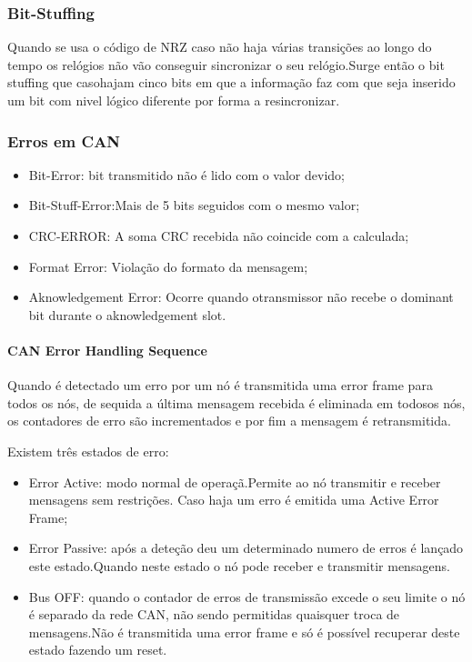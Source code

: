 \documentclass[10pt,a4paper]{paper}
\begin{document}
\subsubsection*{Bit-Stuffing}
Quando se usa o código de NRZ caso não haja várias transições ao longo do tempo os relógios não vão conseguir sincronizar o seu relógio.Surge então o bit stuffing que casohajam cinco bits em que a informação faz com que seja inserido um bit com nivel lógico diferente por forma a resincronizar.


\subsubsection*{Erros em CAN}
\begin{itemize}
	\item Bit-Error: bit transmitido não é lido com o valor devido;
	\item Bit-Stuff-Error:Mais de 5 bits seguidos com o mesmo valor;
	\item CRC-ERROR: A soma CRC recebida não coincide com a calculada;
	\item Format Error: Violação do formato da mensagem;
	\item Aknowledgement Error: Ocorre quando otransmissor não recebe o dominant bit durante o aknowledgement slot.
\end{itemize}

\paragraph{CAN Error Handling  Sequence}

Quando é detectado um erro por um nó é transmitida uma error frame para todos os nós, de sequida a última mensagem recebida é eliminada em todosos nós, os contadores de erro são incrementados e por fim a mensagem é retransmitida.

Existem três estados de erro:
\begin{itemize}
	\item Error Active: modo normal de operaçã.Permite ao nó transmitir e receber mensagens sem restrições. Caso haja um erro é emitida uma Active Error Frame;
	\item Error Passive: após a deteção deu um determinado numero de erros é lançado este estado.Quando neste estado o nó pode receber e transmitir mensagens.
	\item Bus OFF: quando o contador de erros de transmissão excede o seu limite o nó é separado da rede CAN, não sendo permitidas quaisquer troca de mensagens.Não é transmitida uma error frame e só é possível recuperar deste estado fazendo um reset.
\end{itemize} 
\end{document}
